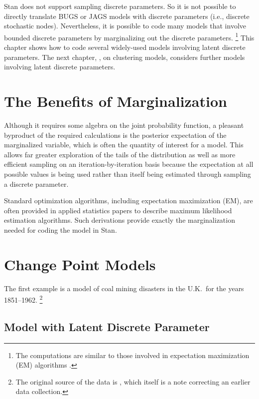 \noindent
Stan does not support sampling discrete parameters.  So it is not
possible to directly translate BUGS or JAGS models with discrete
parameters (i.e., discrete stochastic nodes).  Nevertheless, it is
possible to code many models that involve bounded discrete
parameters by marginalizing out the discrete parameters.%
%
\footnote{The computations are similar to those involved in
  expectation maximization (EM) algorithms
  \citep{dempster-et-al:1977}.}
%
This chapter shows how to code several widely-used models involving
latent discrete parameters.  The next chapter,
, on clustering models, considers further
models involving latent discrete parameters.

\section{The Benefits of Marginalization}\label{rao-blackwell.section}

Although it requires some algebra on the joint probability function,
a pleasant byproduct of the required calculations is the posterior
expectation of the marginalized variable, which is often the quantity
of interest for a model.  This allows far greater exploration of the
tails of the distribution as well as more efficient sampling on an
iteration-by-iteration basis because the expectation at all possible
values is being used rather than itself being estimated through
sampling a discrete parameter.

Standard optimization algorithms, including expectation maximization
(EM), are often provided in applied statistics papers to describe
maximum likelihood estimation algorithms.  Such derivations provide
exactly the marginalization needed for coding the model in Stan.
 
\section{Change Point Models}

The first example is a model of coal mining disasters in the U.K.\
for the years 1851--1962.%
%
\footnote{The original source of the data is \citep{Jarret:1979},
  which itself is a note correcting an earlier data collection.}
%

\subsection{Model with Latent Discrete Parameter}

